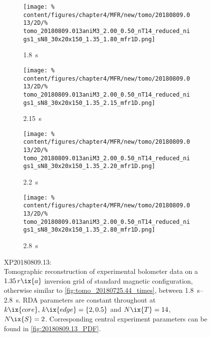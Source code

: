 %
            \begin{figure}[t]%
                \centering%
                \begin{subfigure}{0.48\textwidth}%
                    \centering%
                    \caption{\SI{1.8}{\second}}%
                    \texttt{[image: \%
                        content/figures/chapter4/MFR/new/tomo/20180809.013/2D/\%
                        tomo\_20180809.013aniM3\_2.00\_0.50\_nT14\_reduced\_nigs1\_sN8\_30x20x150\_1.35\_1.80\_mfr1D.png]}%
                \end{subfigure}%
                \hfill%
                \begin{subfigure}{0.48\textwidth}%
                    \centering%
                    \caption{\SI{2.15}{\second}}%
                    \texttt{[image: \%
                        content/figures/chapter4/MFR/new/tomo/20180809.013/2D/\%
                        tomo\_20180809.013aniM3\_2.00\_0.50\_nT14\_reduced\_nigs1\_sN8\_30x20x150\_1.35\_2.15\_mfr1D.png]}%
                \end{subfigure}%
                \newline%
                \begin{subfigure}{0.48\textwidth}%
                    \centering%
                    \caption{\SI{2.2}{\second}}%
                    \texttt{[image: \%
                        content/figures/chapter4/MFR/new/tomo/20180809.013/2D/\%
                        tomo\_20180809.013aniM3\_2.00\_0.50\_nT14\_reduced\_nigs1\_sN8\_30x20x150\_1.35\_2.20\_mfr1D.png]}%
                \end{subfigure}%
                \hfill%
                \begin{subfigure}{0.48\textwidth}%
                    \centering%
                    \caption{\SI{2.8}{\second}}%
                    \texttt{[image: \%
                        content/figures/chapter4/MFR/new/tomo/20180809.013/2D/\%
                        tomo\_20180809.013aniM3\_2.00\_0.50\_nT14\_reduced\_nigs1\_sN8\_30x20x150\_1.35\_2.80\_mfr1D.png]}%
                \end{subfigure}%
                \caption{%
                    XP20180809.13:\\%
                    Tomographic reconstruction of experimental bolometer data on a $1.35\,r\ix{a}$ inversion grid of standard magnetic configuration, otherwise similar to \cref{fig:tomo_20180725.44_times}, between \SIrange{1.8}{2.8}{\second}. RDA parameters are constant throughout at $k\ix{core},\,k\ix{edge}=\left\{2, 0.5\right\}$ and $N\ix{T}=14$, $N\ix{S}=2$. Corresponding central experiment parameters can be found in \cref{fig:20180809.13_PDF}.}\label{fig:tomo_20180809.13_times}%
            \end{figure}%
